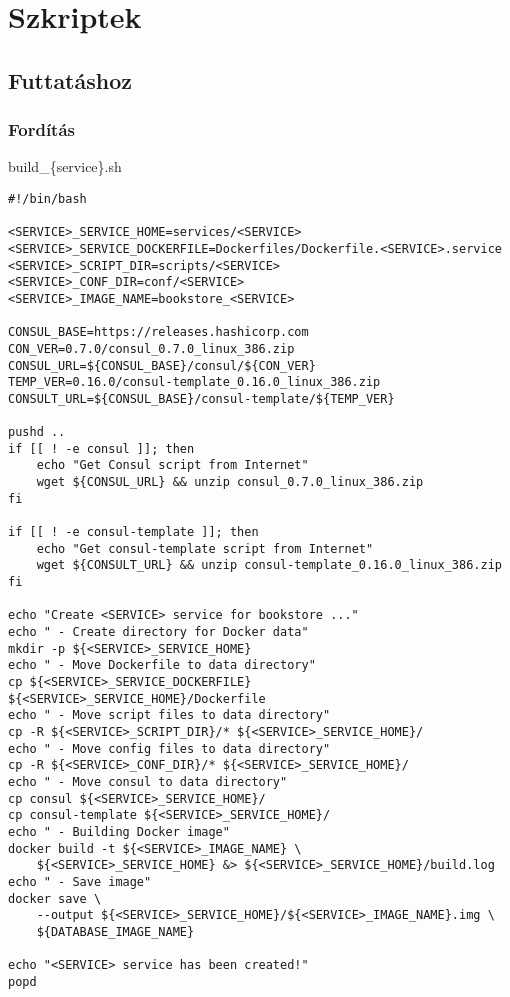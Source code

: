 \section{Szkriptek}\label{szkriptek}

\subsection{Futtatáshoz}\label{futtatuxe1shoz}

\subsubsection{\texorpdfstring{Fordítás\label{appendix-build}}{Fordítás}}\label{forduxedtuxe1s}

build\_\{service\}.sh

\begin{verbatim}
#!/bin/bash

<SERVICE>_SERVICE_HOME=services/<SERVICE>
<SERVICE>_SERVICE_DOCKERFILE=Dockerfiles/Dockerfile.<SERVICE>.service
<SERVICE>_SCRIPT_DIR=scripts/<SERVICE>
<SERVICE>_CONF_DIR=conf/<SERVICE>
<SERVICE>_IMAGE_NAME=bookstore_<SERVICE>

CONSUL_BASE=https://releases.hashicorp.com
CON_VER=0.7.0/consul_0.7.0_linux_386.zip
CONSUL_URL=${CONSUL_BASE}/consul/${CON_VER}
TEMP_VER=0.16.0/consul-template_0.16.0_linux_386.zip
CONSULT_URL=${CONSUL_BASE}/consul-template/${TEMP_VER}

pushd ..
if [[ ! -e consul ]]; then
    echo "Get Consul script from Internet"
    wget ${CONSUL_URL} && unzip consul_0.7.0_linux_386.zip
fi

if [[ ! -e consul-template ]]; then
    echo "Get consul-template script from Internet"
    wget ${CONSULT_URL} && unzip consul-template_0.16.0_linux_386.zip
fi

echo "Create <SERVICE> service for bookstore ..."
echo " - Create directory for Docker data"
mkdir -p ${<SERVICE>_SERVICE_HOME}
echo " - Move Dockerfile to data directory"
cp ${<SERVICE>_SERVICE_DOCKERFILE} ${<SERVICE>_SERVICE_HOME}/Dockerfile
echo " - Move script files to data directory"
cp -R ${<SERVICE>_SCRIPT_DIR}/* ${<SERVICE>_SERVICE_HOME}/
echo " - Move config files to data directory"
cp -R ${<SERVICE>_CONF_DIR}/* ${<SERVICE>_SERVICE_HOME}/
echo " - Move consul to data directory"
cp consul ${<SERVICE>_SERVICE_HOME}/
cp consul-template ${<SERVICE>_SERVICE_HOME}/
echo " - Building Docker image"
docker build -t ${<SERVICE>_IMAGE_NAME} \
    ${<SERVICE>_SERVICE_HOME} &> ${<SERVICE>_SERVICE_HOME}/build.log
echo " - Save image"
docker save \
    --output ${<SERVICE>_SERVICE_HOME}/${<SERVICE>_IMAGE_NAME}.img \
    ${DATABASE_IMAGE_NAME}

echo "<SERVICE> service has been created!"
popd
\end{verbatim}

